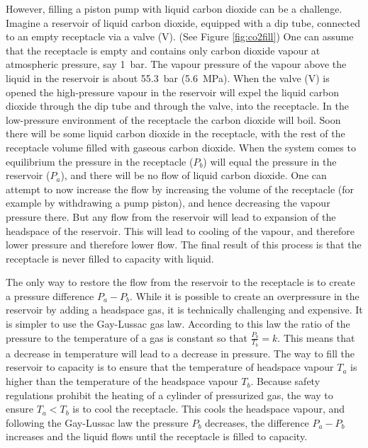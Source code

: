 However, filling a piston pump with liquid carbon dioxide can be a challenge.
Imagine a reservoir of liquid carbon dioxide, equipped with a dip tube,
connected to an empty receptacle via a valve (V). (See Figure \ref{fig:co2fill})
One can assume that the receptacle is empty and contains only carbon dioxide
vapour at atmospheric pressure, say \SI{1}{\bar}. The vapour pressure of the
vapour above the liquid in the reservoir is about \SI{55.3}{\bar}
(\SI{5.6}{\mega\pascal}). When the valve (V) is opened the high-pressure
vapour in the reservoir will expel the liquid carbon dioxide through the dip
tube and through the valve, into the receptacle. In the low-pressure environment
of the receptacle the carbon dioxide will boil. Soon there will be some liquid
carbon dioxide in the receptacle, with the rest of the receptacle volume filled
with gaseous carbon dioxide. When the system comes to equilibrium the pressure
in the receptacle (\(P_b\)) will equal the pressure in the reservoir (\(P_a\)), and
there will be no flow of liquid carbon dioxide. One can attempt to now increase
the flow by increasing the volume of the receptacle (for example by withdrawing
a pump piston), and hence decreasing the vapour pressure there. But any flow
from the reservoir will lead to expansion of the headspace of the reservoir.
This will lead to cooling of the vapour, and therefore lower pressure and
therefore lower flow. The final result of this process is that the receptacle is
never filled to capacity with liquid.

The only way to restore the flow from the reservoir to the receptacle is to
create a pressure difference \(P_a - P_b\). While it is possible to create an
overpressure in the reservoir by adding a headspace gas, it is technically
challenging and expensive. It is simpler to use the Gay-Lussac gas law.
According to this law the ratio of the pressure to the temperature of a gas is
constant so that \(\frac{P_b}{T_b} = k\). This means that a decrease in
temperature will lead to a decrease in pressure. The way to fill the reservoir
to capacity is to ensure that the temperature of headspace vapour \(T_a\) is higher
than the temperature of the headspace vapour \(T_b\). Because safety regulations
prohibit the heating of a cylinder of pressurized gas, the way to ensure \(T_a <
T_b\) is to cool the receptacle. This cools the headspace vapour, and following
the Gay-Lussac law the pressure \(P_b\) decreases, the difference \(P_a - P_b\)
increases and the liquid flows until the receptacle is filled to capacity.
 
